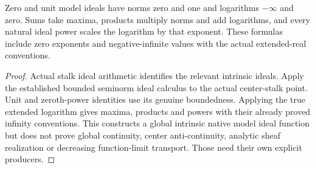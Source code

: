 \begin{theorem}
\label{scheme:native-model-ideal-arithmetic}
\leanok
{}
Zero and unit model ideals have norms zero and one and logarithms
$-\infty$ and zero. Sums take maxima, products multiply norms and add
logarithms, and every natural ideal power scales the logarithm by that
exponent. These formulas include zero exponents and negative-infinite
values with the actual extended-real conventions.
\end{theorem}
\begin{proof}
Actual stalk ideal arithmetic identifies the relevant intrinsic ideals.
Apply the established bounded seminorm ideal calculus to the actual
center-stalk point. Unit and zeroth-power identities use its genuine
boundedness. Applying the true extended logarithm gives maxima, products
and powers with their already proved infinity conventions. This constructs
a global intrinsic native model ideal function but does not prove global
continuity, center anti-continuity, analytic sheaf realization or decreasing
function-limit transport. Those need their own explicit producers.
\end{proof}
